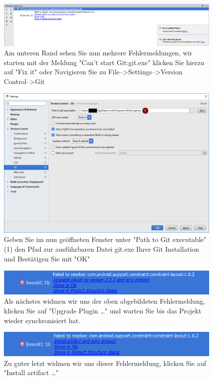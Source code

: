 \documentclass[a4paper,10pt,xetex]{article}
\begin{document}
\begin{figure}
  \centering
  \includegraphics[width=\textwidth]{Installation/2-3}
  \caption{Am unteren Rand sehen Sie nun mehrere Fehlermeldungen, wir starten mit der Meldung "Can't start Git:git.exe" klicken Sie hierzu auf "Fix it" oder Navigieren Sie zu File-->Settings-->Version Control-->Git}
\end{figure}

\begin{figure}
  \centering
  \includegraphics[width=\textwidth]{Installation/2-4}
  \caption{Geben Sie im nun geöffneten Fenster unter "Path to Git executable"(1) den Pfad zur ausführbaren Datei git.exe Ihrer Git Installation und Bestätigen Sie mit "OK"}
\end{figure}

\begin{figure}
  \centering
  \includegraphics[width=\textwidth]{Installation/2-5}
  \caption{Als nächstes widmen wir uns der oben abgebildeten Fehlermeldung, klicken Sie auf "Upgrade Plugin \ldots" und warten Sie bis das Projekt wieder synchronisiert hat.}
\end{figure}

\begin{figure}
  \centering
  \includegraphics[width=\textwidth]{Installation/2-6}
  \caption{Zu guter letzt widmen wir uns dieser Fehlermeldung, klicken Sie auf "Install artifact \ldots"}
\end{figure}
\end{document}
